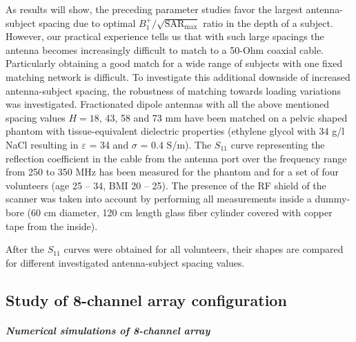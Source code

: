 \documentclass[fleqn,10pt]{wlscirep}
\begin{document}
As results will show, the preceding parameter studies favor the largest antenna-subject spacing due to optimal $B_1^{+}/\sqrt{\text{SAR}_{\text{max}}}$ ratio in the depth of a subject. However, our practical experience tells us that with such large spacings the antenna becomes increasingly difficult to match to a 50-Ohm coaxial cable. Particularly obtaining a good match for a wide range of subjects with one fixed matching network is difficult. To investigate this additional downside of increased antenna-subject spacing, the robustness of matching towards loading variations was investigated. Fractionated dipole antennas with all the above mentioned spacing values $H=18$, 43, 58 and 73 mm have been matched on a pelvic shaped phantom with tissue-equivalent dielectric properties (ethylene glycol with 34 g/l NaCl resulting in $\varepsilon$ = 34 and $\sigma$ = 0.4 S/m). The $S_{11}$ curve representing the reflection coefficient in the cable from the antenna port over the frequency range from 250 to 350 MHz has been measured for the phantom and for a set of four volunteers (age 25 – 34, BMI 20 – 25). The presence of the RF shield of the scanner was taken into account by performing all measurements inside a dummy-bore (60 cm diameter, 120 cm length glass fiber cylinder covered with copper tape from the inside).

After the $S_{11}$ curves were obtained for all volunteers, their shapes are compared for different investigated antenna-subject spacing values. 

\subsection*{Study of 8-channel array configuration}

\subparagraph*{Numerical simulations of 8-channel array}
\end{document}

